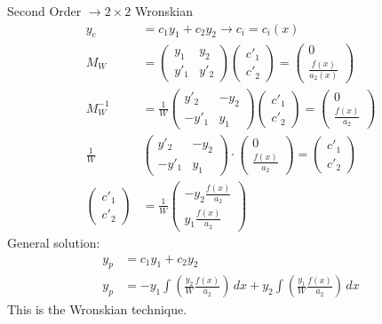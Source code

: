 \documentclass[Maths.tex]{subfiles}
\begin{document}
\begin{example}[2nd Order]
Second Order $\to 2\times2$ Wronskian
\begin{align}
    y_c &= c_1y_1 + c_2y_2 \to c_i = c_i(x) \\
    M_W &= \begin{pmatrix} y_1 & y_2 \\ y'_1 & y'_2 \end{pmatrix}\begin{pmatrix} c'_1 \\ c'_2 \end{pmatrix} = \begin{pmatrix} 0 \\ \frac{f(x)}{a_2(x)} \end{pmatrix} \\
    M_W^{-1} &= \frac{1}{W} \begin{pmatrix} y'_2 & -y_2 \\ -y'_1 & y_1 \end{pmatrix} \begin{pmatrix} c'_1 \\ c'_2 \end{pmatrix} = \begin{pmatrix} 0 \\ \frac{f(x)}{a_2} \end{pmatrix} \\
    \frac{1}{W}&\begin{pmatrix} y'_2 & -y_2 \\ -y'_1 & y_1 \end{pmatrix}\cdot \begin{pmatrix} 0 \\ \frac{f(x)}{a_2} \end{pmatrix} = \begin{pmatrix} c'_1 \\ c'_2 \end{pmatrix} \\
    \begin{pmatrix} c'_1 \\ c'_2 \end{pmatrix} &= \frac{1}{W}\begin{pmatrix} -y_2\frac{f(x)}{a_2} \\ y_1\frac{f(x)}{a_2} \end{pmatrix}
\end{align}
General solution:
\begin{align}
    y_p &= c_1y_1 + c_2y_2 \\
    y_p &= -y_1\int \left(\frac{y_2}{W}\frac{f(x)}{a_2}\right)\,dx + y_2\int \left(\frac{y_1}{W}\frac{f(x)}{a_2}\right)\,dx
\end{align}
This is the Wronskian technique.
\end{example}
\end{document}
